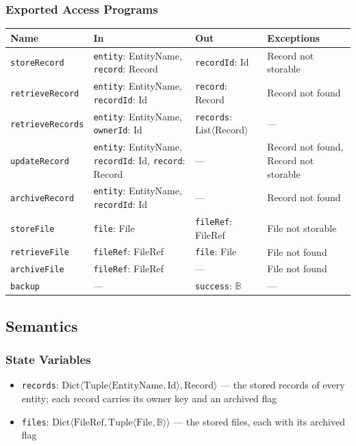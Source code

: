 \documentclass[12pt, titlepage]{article}
\begin{document}
\subsubsection{Exported Access Programs}
\begin{tabularx}{\textwidth}{p{2.9cm} p{3.9cm} p{3.2cm} X}
\toprule
\textbf{Name} & \textbf{In} & \textbf{Out} & \textbf{Exceptions} \\
\midrule
\texttt{storeRecord} & \texttt{entity}: EntityName, \texttt{record}: Record & \texttt{recordId}: Id & Record not storable \\
\texttt{retrieveRecord} & \texttt{entity}: EntityName, \texttt{recordId}: Id & \texttt{record}: Record & Record not found \\
\texttt{retrieveRecords} & \texttt{entity}: EntityName, \texttt{ownerId}: Id & \texttt{records}: $\text{List}\langle \text{Record} \rangle$ & --- \\
\texttt{updateRecord} & \texttt{entity}: EntityName, \texttt{recordId}: Id, \texttt{record}: Record & --- & Record not found, Record not storable \\
\texttt{archiveRecord} & \texttt{entity}: EntityName, \texttt{recordId}: Id & --- & Record not found \\
\texttt{storeFile} & \texttt{file}: File & \texttt{fileRef}: FileRef & File not storable \\
\texttt{retrieveFile} & \texttt{fileRef}: FileRef & \texttt{file}: File & File not found \\
\texttt{archiveFile} & \texttt{fileRef}: FileRef & --- & File not found \\
\texttt{backup} & --- & \texttt{success}: $\mathbb{B}$ & --- \\
\bottomrule
\end{tabularx}

\subsection{Semantics}

\subsubsection{State Variables}
\begin{itemize}
  \item \texttt{records}: $\text{Dict}\langle \text{Tuple}\langle \text{EntityName}, \text{Id} \rangle, \text{Record} \rangle$ --- the stored records of every entity; each record carries its owner key and an archived flag
  \item \texttt{files}: $\text{Dict}\langle \text{FileRef}, \text{Tuple}\langle \text{File}, \mathbb{B} \rangle \rangle$ --- the stored files, each with its archived flag
\end{itemize}
\end{document}
